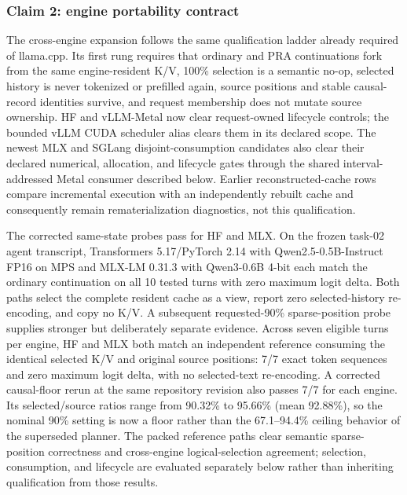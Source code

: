 \documentclass[11pt]{article}
\begin{document}
\subsubsection{Claim 2: engine portability contract}

The cross-engine expansion follows the same qualification ladder already
required of llama.cpp.  Its first rung requires that ordinary and PRA
continuations fork from the same engine-resident K/V, 100\% selection is a
semantic no-op, selected history is never tokenized or prefilled again, source
positions and stable causal-record identities survive, and request membership
does not mutate source ownership.  HF and vLLM-Metal now clear request-owned
lifecycle controls; the bounded vLLM CUDA scheduler alias clears them in its
declared scope.  The newest MLX and SGLang disjoint-consumption candidates also
clear their declared numerical, allocation, and lifecycle gates through the
shared interval-addressed Metal consumer described below.
Earlier reconstructed-cache rows compare incremental execution with an
independently rebuilt cache and consequently remain rematerialization
diagnostics, not this qualification.

The corrected same-state probes pass for HF and MLX.
On the frozen task-02 agent transcript, Transformers 5.17/PyTorch 2.14 with
Qwen2.5-0.5B-Instruct FP16 on MPS and MLX-LM 0.31.3 with Qwen3-0.6B 4-bit each
match the ordinary continuation on all 10 tested turns with zero maximum logit
delta.  Both paths select the complete resident cache as a view, report zero
selected-history re-encoding, and copy no K/V.  A subsequent requested-90\%
sparse-position probe supplies stronger but deliberately separate evidence.
Across seven eligible turns per engine, HF and MLX both match an independent
reference consuming the identical selected K/V and original source positions:
7/7 exact token sequences and zero maximum logit delta, with no selected-text
re-encoding.  A corrected causal-floor rerun at the same repository revision
also passes 7/7 for each engine.  Its selected/source ratios range from
90.32\% to 95.66\% (mean 92.88\%), so the nominal 90\% setting is now a floor
rather than the 67.1--94.4\% ceiling behavior of the superseded planner.  The
packed reference paths clear semantic sparse-position correctness and
cross-engine logical-selection agreement; selection, consumption, and
lifecycle are evaluated separately below rather than inheriting qualification
from those results.
\end{document}
